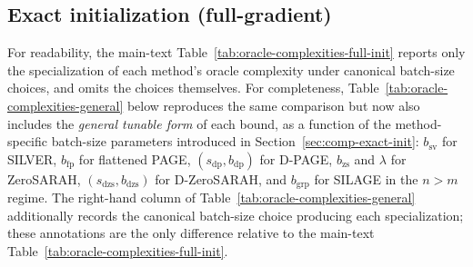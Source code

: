 \documentclass{article}
\theoremstyle{plain}
\newcommand{\algname}[1]{{\sf\scalefont{0.88}\color{mydarkgreen}#1}\xspace}
\def\algname#1{#1}%
\begin{document}
\subsection{Exact initialization (full-gradient)}
\label{sec:app-comparison-baselines-general-table}

For readability, the main-text Table~\ref{tab:oracle-complexities-full-init} reports only the specialization of each method's oracle complexity under canonical batch-size choices, and omits the choices themselves. For completeness, Table~\ref{tab:oracle-complexities-general} below reproduces the same comparison but now also includes the \emph{general tunable form} of each bound, as a function of the method-specific batch-size parameters introduced in Section~\ref{sec:comp-exact-init}: $b_{\mathrm{sv}}$ for \algname{SILVER}, $b_{\mathrm{fp}}$ for flattened \algname{PAGE}, $(s_{\mathrm{dp}},b_{\mathrm{dp}})$ for \algname{D-PAGE}, $b_{\mathrm{zs}}$ and $\lambda$ for \algname{ZeroSARAH}, $(s_{\mathrm{dzs}},b_{\mathrm{dzs}})$ for \algname{D-ZeroSARAH}, and $b_{\mathrm{grp}}$ for \algname{SILAGE} in the $n>m$ regime. The right-hand column of Table~\ref{tab:oracle-complexities-general} additionally records the canonical batch-size choice producing each specialization; these annotations are the only difference relative to the main-text Table~\ref{tab:oracle-complexities-full-init}.
\end{document}
